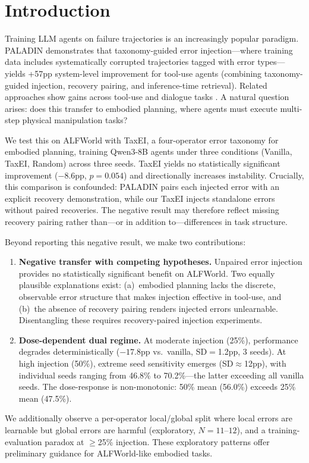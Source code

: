 \section{Introduction}
\label{sec:introduction}

Training LLM agents on failure trajectories is an increasingly popular paradigm. PALADIN \cite{paladin2025} demonstrates that taxonomy-guided error injection---where training data includes systematically corrupted trajectories tagged with error types---yields +57pp system-level improvement for tool-use agents (combining taxonomy-guided injection, recovery pairing, and inference-time retrieval). Related approaches show gains across tool-use \cite{song2024eto,eef2025,wang2024learning_from_failure} and dialogue tasks \cite{agentHER2025}. A natural question arises: does this transfer to embodied planning, where agents must execute multi-step physical manipulation tasks?

We test this on ALFWorld \cite{shridhar2021alfworld} with TaxEI, a four-operator error taxonomy for embodied planning, training Qwen3-8B agents under three conditions (Vanilla, TaxEI, Random) across three seeds. TaxEI yields no statistically significant improvement ($-8.6$pp, $p{=}0.054$) and directionally increases instability. Crucially, this comparison is confounded: PALADIN pairs each injected error with an explicit recovery demonstration, while our TaxEI injects standalone errors without paired recoveries. The negative result may therefore reflect missing recovery pairing rather than---or in addition to---differences in task structure.

Beyond reporting this negative result, we make two contributions:

\begin{enumerate}[nosep,leftmargin=*]
\item \textbf{Negative transfer with competing hypotheses.} Unpaired error injection provides no statistically significant benefit on ALFWorld. Two equally plausible explanations exist: (a)~embodied planning lacks the discrete, observable error structure that makes injection effective in tool-use, and (b)~the absence of recovery pairing renders injected errors unlearnable. Disentangling these requires recovery-paired injection experiments.

\item \textbf{Dose-dependent dual regime.} At moderate injection (25\%), performance degrades deterministically ($-17.8$pp vs.\ vanilla, SD${=}$1.2pp, 3 seeds). At high injection (50\%), extreme seed sensitivity emerges (SD${\approx}$12pp), with individual seeds ranging from 46.8\% to 70.2\%---the latter exceeding all vanilla seeds. The dose-response is non-monotonic: 50\% mean (56.0\%) exceeds 25\% mean (47.5\%).
\end{enumerate}

We additionally observe a per-operator local/global split where local errors are learnable but global errors are harmful (exploratory, $N{=}11$--$12$), and a training-evaluation paradox at $\geq$25\% injection. These exploratory patterns offer preliminary guidance for ALFWorld-like embodied tasks.
